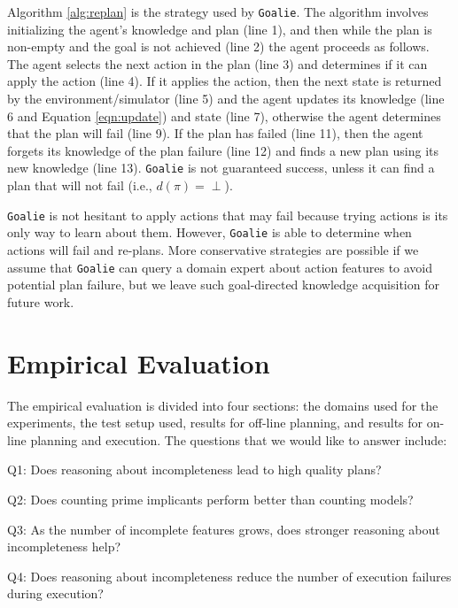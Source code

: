 \documentclass[letterpaper]{article}
\newenvironment{packed_itemize}{
\begin{itemize}
  \setlength{\itemsep}{1pt}
  \setlength{\parskip}{0pt}
  \setlength{\parsep}{0pt}
}{\end{itemize}}
\def\goalie{{\tt Goalie}}
\begin{document}
Algorithm \ref{alg:replan} is the strategy used by \goalie{}.  The algorithm
involves initializing the agent's knowledge and plan (line 1), and then while
the plan is non-empty and the goal is not achieved (line 2) the agent proceeds
as follows.  The agent selects the next action in the plan (line 3) and
determines if it can apply the action (line 4).  If it applies the action, then
the next state is returned by the environment/simulator (line 5) and the agent
updates its knowledge (line 6 and Equation \ref{eqn:update}) and state (line 7),
otherwise the agent determines that the plan will fail (line 9).  If the plan
has failed (line 11), then the agent forgets its knowledge of the plan failure
(line 12) and finds a new plan using its new knowledge (line 13). \goalie{} is
not guaranteed success, unless it can find a plan that will not fail (i.e., 
$d(\pi) = \perp$).

\goalie{} is not hesitant to apply actions that may fail because trying actions
is its only way to learn about them.  However, \goalie{} is able to determine
when actions will fail and re-plans.  More conservative strategies are possible
if we assume that \goalie{} can query a domain expert about action features
to avoid potential plan failure, but we leave such goal-directed knowledge
acquisition for future work.


\section{Empirical Evaluation}\label{sec:empirical}

The empirical evaluation is divided into four sections:  the domains used for
the experiments, the test setup used, results for off-line planning, and results
for on-line planning and execution.  The questions that we would like to answer
include:
\begin{packed_itemize}
\item Q1: Does reasoning about incompleteness lead to high quality plans?
\item Q2: Does counting prime implicants perform better than counting models?
\item Q3: As the number of incomplete features grows, does stronger reasoning
about incompleteness help?
\item Q4: Does reasoning about incompleteness reduce the number of
execution failures during execution?
\end{packed_itemize}
\end{document}
